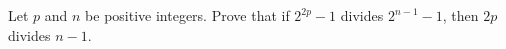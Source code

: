 Let $p$ and $n$ be positive integers. Prove that if $2^{2p}-1$ divides $2^{n-1}-1$, then $2p$ divides $n-1$.
